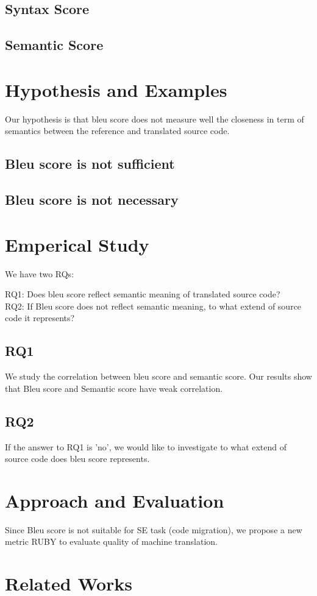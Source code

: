 \subsection{Syntax Score}
\subsection{Semantic Score}

\section{Hypothesis and Examples}
Our hypothesis is that bleu score does not measure well the closeness in term of semantics between the reference and translated source code. 
\subsection{Bleu score is not sufficient}
\subsection{Bleu score is not necessary}
\section{Emperical Study}
We have two RQs:

RQ1: Does bleu score reflect semantic meaning of translated source code? \\
RQ2: If Bleu score does not reflect semantic meaning, to what extend of source code it represents?
\subsection{RQ1}
We study the correlation between bleu score and semantic score. Our results show that Bleu score and Semantic score have weak correlation.
\subsection{RQ2} 
If the answer to RQ1 is 'no', we would like to investigate to what extend of source code does bleu score represents.

\section{Approach and Evaluation}
Since Bleu score is not suitable for SE task (code migration), we propose a new metric RUBY to evaluate quality of machine translation. 
\section{Related Works}

